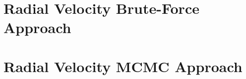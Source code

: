 \documentclass[preprint,longauthor]{aastex631}
\numberwithin{equation}{section}
\begin{document}
\appendix
\section[Appendix A]{Radial Velocity Brute-Force Approach}
\label{appx:A}



\section[Appendix B]{Radial Velocity MCMC Approach}
\label{appx:B}




\end{document}
